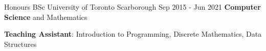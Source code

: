 
\begin{cventries}
  \cventry
    {Honours BSc}
    {University of Toronto}
    {Scarborough}
    {Sep 2015 - Jun 2021}
    {\textbf{Computer Science} and Mathematics}
    {
      \begin{cvitems}
        \item {\textbf{Teaching Assistant}: Introduction to Programming, Discrete Mathematics, Data Structures}
      \end{cvitems}
    }
\end{cventries}
